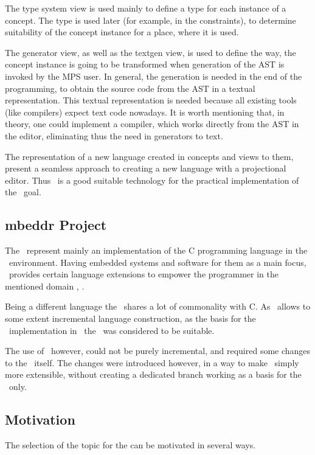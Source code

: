 The type system view is used mainly to define a type for each instance of a concept. The type is used later (for example, in the constraints), to 
determine suitability of the concept instance for a place, where it is used.

The generator view, as well as the textgen view, is used to define the way, the concept instance is going to be transformed when generation of the AST
is invoked by the MPS user. In general, the generation is needed in the end of the programming, to obtain the source code from the AST in a textual representation.
This textual representation is needed because all existing tools (like compilers) expect text code nowadays. It is worth mentioning that, in theory, one
could implement a compiler, which works directly from the AST in the editor, eliminating thus the need in generators to text.

The representation of a new language created in concepts and views to them, present a seamless approach to creating a new language with a projectional editor.
Thus \jbmps\ is a good suitable technology for the practical implementation of the \MT\ goal.

\subsection{mbeddr Project}

The \mbdrp\ represent mainly an implementation of the C programming language in the \jbmps\ environment. Having embedded systems
and software for them as a main focus, \mbdr\ provides certain language extensions to empower the programmer in the mentioned domain \cite{mbeddr-wave}, 
\cite{Voelter:MoDELS:2010}. 

Being a different language the \cpppl\ shares a lot of commonality with C. As \jbmps\ allows to some extent incremental language construction,
as the basis for the \cpppl\ implementation in \jbmps\ the \mbdrp\ was considered to be suitable. 

The use of \mbdr\, however, could not be purely incremental, and required some changes to the \mbdr\ itself. 
The changes were introduced however, in a way to make \mbdr\ simply more extensible, 
without creating a dedicated branch working as a basis for the \cpppl\ only.

\subsection{Motivation}

The selection of the topic for the \MT can be motivated in several ways.

